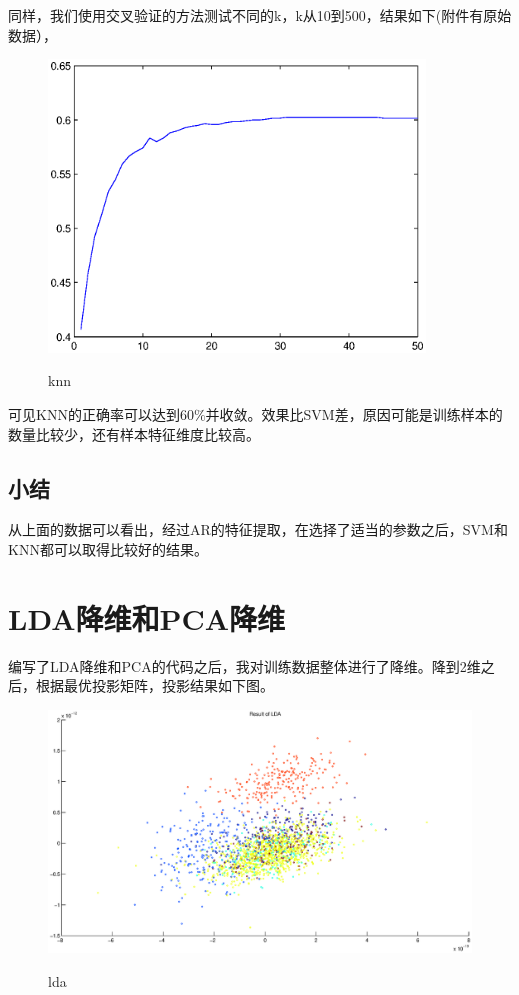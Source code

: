 \documentclass[12pt]{elsarticle}
\begin{document}
同样，我们使用交叉验证的方法测试不同的k，k从10到500，结果如下(附件有原始数据），
\begin{figure}[!ht]
  \centering
  \includegraphics[width=10cm]{knn}\\
  \caption{knn}\label{fig:delay}
\end{figure}

可见KNN的正确率可以达到60$\%$并收敛。效果比SVM差，原因可能是训练样本的数量比较少，还有样本特征维度比较高。


\subsection{小结}
从上面的数据可以看出，经过AR的特征提取，在选择了适当的参数之后，SVM和KNN都可以取得比较好的结果。


\section{LDA降维和PCA降维}
编写了LDA降维和PCA的代码之后，我对训练数据整体进行了降维。降到2维之后，根据最优投影矩阵，投影结果如下图。
\begin{figure}[!ht]
  \centering
  \includegraphics[width=15cm]{lda}\\
  \caption{lda}\label{fig:delay}
\end{figure}
\end{document}
